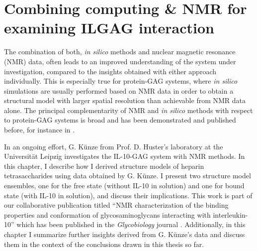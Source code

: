 \chapter{Combining computing \& NMR for examining IL\hyph GAG
interaction}
\label{chapter:nmr}

The combination of both, \textit{in silico} methods and nuclear magnetic
resonance (NMR) data, often leads to an improved understanding of the system
under investigation, compared to the insights obtained with either approach
individually. This is especially true for protein-GAG systems, where \textit{in
silico} simulations are usually performed based on NMR data in order to obtain a
structural model with larger spatial resolution than achievable from NMR data
alone. The principal complementarity of NMR and \textit{in silico} methods with
respect to protein-GAG systems is broad and has been demonstrated and published
before, for instance in \cite{pichert_characterization_2012, sost_heparin_2009,
nieto_conf_selection_heparin_2011}.

In an ongoing effort, G. Künze from Prof. D. Huster's laboratory at the
Universität Leipzig investigates the IL-10-GAG system with NMR methods. In this
chapter, I describe how I derived structure models of heparin tetrasaccharides
using data obtained by G. Künze. I present two structure model ensembles, one
for the free state (without IL-10 in solution) and one for bound state (with
IL-10 in solution), and discuss their implications. This work is part of our
collaborative publication titled \enquote{NMR characterization of the binding
properties and conformation of glycosaminoglycans interacting with
interleukin-10} which has been published in the \textit{Glycobiology} journal
\cite{kuenze_gehrcke_2014}. Additionally, in this chapter I summarize further
insights derived from G. Künze's data and discuss them in the context of the
conclusions drawn in this thesis so far.


